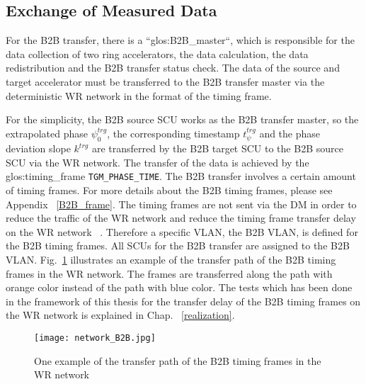\subsection{Exchange of Measured Data}

For the B2B transfer, there is a ``\gls{glos:B2B_master}``, which is responsible for the data collection of two ring accelerators, the data calculation, the data redistribution and the B2B transfer status check. The data of the source and target accelerator must be transferred to the B2B transfer master via the deterministic WR network in the format of the timing frame.
 
For the simplicity, the B2B source SCU works as the B2B transfer master, so the extrapolated phase $\psi^\mathit{trg}_0$, the corresponding timestamp $t_\psi^\mathit{trg}$ and the phase deviation slope $k^\mathit{trg}$ are transferred by the B2B target SCU to the B2B source SCU via the WR network. The transfer of the data is achieved by the \gls{glos:timing_frame} \verb|TGM_PHASE_TIME|. The B2B transfer involves a certain amount of timing frames. For more details about the B2B timing frames, please see Appendix ~\ref{B2B_frame}. The timing frames are not sent via the DM in order to reduce the traffic of the WR network and reduce the timing frame transfer delay on the WR network ~\cite{bai_concept_2016}. Therefore a specific VLAN, the B2B \gls{VLAN}, is defined for the B2B timing frames. All SCUs for the B2B transfer are assigned to the B2B VLAN. Fig.~\ref{network_B2B} illustrates an example of the transfer path of the B2B timing frames in the WR network. The frames are transferred along the path with orange color instead of the path with blue color. The tests which has been done in the framework of this thesis for the transfer delay of the B2B timing frames on the WR network is explained in Chap. ~\ref{realization}.
 \begin{figure}[!htb]
   \centering   
   \texttt{[image: network\_B2B.jpg]}
   \caption{One example of the transfer path of the B2B timing frames in the WR network}
   \label{network_B2B}
\end{figure}
